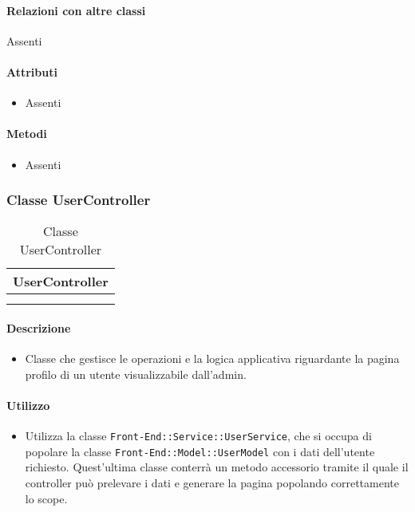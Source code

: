 \paragraph*{Relazioni con altre classi}
Assenti

\paragraph*{Attributi}
\begin{itemize}
\item[] Assenti
\end{itemize}

\paragraph*{Metodi}
\begin{itemize}
\item[] Assenti
\end{itemize}

\subsubsection{Classe UserController}

\begin{table}[ht]
\begin{center}
\bgroup
\setlength{\arrayrulewidth}{0.6mm}
\def\arraystretch{1}
\begin{tabular}{ | p{12cm} | }
\hline
\centerline{\textbf{UserController}}
\\ \hline
 \\ 
\hline
 \\ 
\hline
\end{tabular}
\egroup
\caption{Classe UserController}
\end{center}
\end{table}

\paragraph*{Descrizione}
\begin{itemize}
\item[] Classe che gestisce le operazioni e la logica applicativa riguardante la pagina profilo di un utente visualizzabile dall'admin.
\end{itemize}

\paragraph*{Utilizzo}
\begin{itemize}
\item[] Utilizza la classe \texttt{Front-End::Service::UserService}, che si occupa di popolare la classe \texttt{Front-End::Model::UserModel} con i dati dell'utente richiesto. Quest'ultima classe conterrà un metodo accessorio tramite il quale il controller può prelevare i dati e generare la pagina popolando correttamente lo scope.
\end{itemize}

